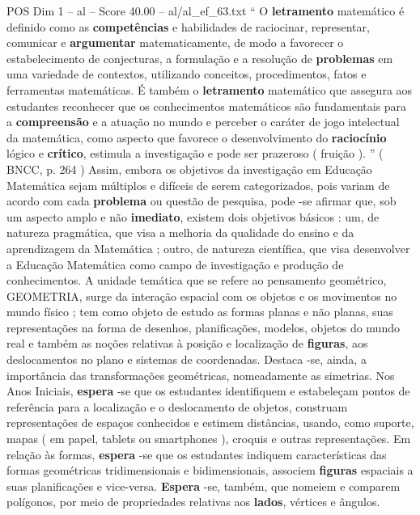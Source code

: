 \begin{textsample}{POS Dim 1 – al – Score 40.00 – al/al\_ef\_63.txt}  \label{ex:f1_pos_157}
“ O \textbf{letramento} matemático é definido como as \textbf{competências} e habilidades de raciocinar, representar, comunicar e \textbf{argumentar} matematicamente, de modo a favorecer o estabelecimento de conjecturas, a formulação e a resolução de \textbf{problemas} em uma variedade de contextos, utilizando conceitos, procedimentos, fatos e ferramentas matemáticas.
É também o \textbf{letramento} matemático que assegura aos estudantes reconhecer que os conhecimentos matemáticos são fundamentais para a \textbf{compreensão} e a atuação no mundo e perceber o caráter de jogo intelectual da matemática, como aspecto que favorece o desenvolvimento do \textbf{raciocínio} lógico e \textbf{crítico}, estimula a investigação e pode ser prazeroso ( fruição ). ” ( BNCC, p. 264 ) Assim, embora os objetivos da investigação em Educação Matemática sejam múltiplos e difíceis de serem categorizados, pois variam de acordo com cada \textbf{problema} ou questão de pesquisa, pode -se afirmar que, sob um aspecto amplo e não \textbf{imediato}, existem dois objetivos básicos : um, de natureza pragmática, que visa a melhoria da qualidade do ensino e da aprendizagem da Matemática ; outro, de natureza científica, que visa desenvolver a Educação Matemática como campo de investigação e produção de conhecimentos.
A unidade temática que se refere ao pensamento geométrico, GEOMETRIA, surge da interação espacial com os objetos e os movimentos no mundo físico ; tem como objeto de estudo as formas planas e não planas, suas representações na forma de desenhos, planificações, modelos, objetos do mundo real e também as noções relativas à posição e localização de \textbf{figuras}, aos deslocamentos no plano e sistemas de coordenadas.
Destaca -se, ainda, a importância das transformações geométricas, nomeadamente as simetrias.
Nos Anos Iniciais, \textbf{espera} -se que os estudantes identifiquem e estabeleçam pontos de referência para a localização e o deslocamento de objetos, construam representações de espaços conhecidos e estimem distâncias, usando, como suporte, mapas ( em papel, tablets ou smartphones ), croquis e outras representações.
Em relação às formas, \textbf{espera} -se que os estudantes indiquem características das formas geométricas tridimensionais e bidimensionais, associem \textbf{figuras} espaciais a suas planificações e vice-versa. \textbf{Espera} -se, também, que nomeiem e comparem polígonos, por meio de propriedades relativas aos \textbf{lados}, vértices e ângulos.

\end{textsample}
